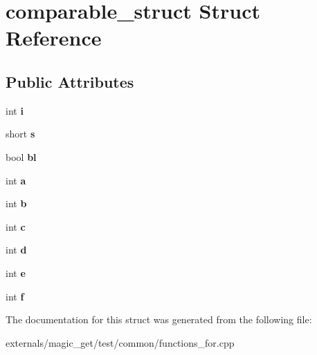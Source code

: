 \hypertarget{structcomparable__struct}{}\section{comparable\+\_\+struct Struct Reference}
\label{structcomparable__struct}
\subsection*{Public Attributes}
\begin{DoxyCompactItemize}
\item 
\mbox{\label{structcomparable__struct_a02b48313446fbd9cfcbbbbd28f1186f0}} 
int {\bfseries i}
\item 
\mbox{\label{structcomparable__struct_a29cd25ee57e557b95b2fc2b8c2f1558e}} 
short {\bfseries s}
\item 
\mbox{\label{structcomparable__struct_a864ae2fa5942c5cb315b0fc9b20a7237}} 
bool {\bfseries bl}
\item 
\mbox{\label{structcomparable__struct_ab71ecfc6b17b90cd2df3edbe74466199}} 
int {\bfseries a}
\item 
\mbox{\label{structcomparable__struct_a9dcf0b79b8534aace3342a4baa257d94}} 
int {\bfseries b}
\item 
\mbox{\label{structcomparable__struct_a7f73f2af135a0cfb7b277ac4312fc67a}} 
int {\bfseries c}
\item 
\mbox{\label{structcomparable__struct_aae09ad3b3da36e5e13731fb0dc037522}} 
int {\bfseries d}
\item 
\mbox{\label{structcomparable__struct_ad781e1b31cd0a14aa9d30c34fa8c704d}} 
int {\bfseries e}
\item 
\mbox{\label{structcomparable__struct_a54e46be83ba83351f497acac8fd0b212}} 
int {\bfseries f}
\end{DoxyCompactItemize}


The documentation for this struct was generated from the following file\+:\begin{DoxyCompactItemize}
\item 
externals/magic\+\_\+get/test/common/functions\+\_\+for.\+cpp\end{DoxyCompactItemize}
